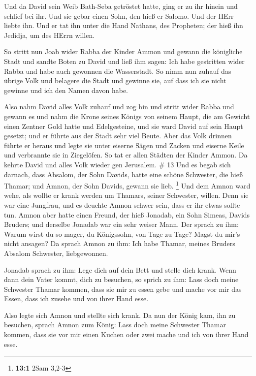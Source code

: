  Und da David sein Weib Bath-Seba getröstet hatte, ging er
zu ihr hinein und schlief bei ihr. Und sie gebar einen Sohn, den hieß er
Salomo. Und der HErr liebte ihn.  Und er tat ihn unter die
Hand Nathans, des Propheten; der hieß ihn Jedidja, um des HErrn willen.

 So stritt nun Joab wider Rabba der Kinder Ammon und gewann
die königliche Stadt  und sandte Boten zu David und ließ
ihm sagen: Ich habe gestritten wider Rabba und habe auch gewonnen die
Wasserstadt.  So nimm nun zuhauf das übrige Volk und
belagere die Stadt und gewinne sie, auf dass ich sie nicht gewinne und
ich den Namen davon habe.

 Also nahm David alles Volk zuhauf und zog hin und stritt
wider Rabba und gewann es  und nahm die Krone seines Königs
von seinem Haupt, die am Gewicht einen Zentner Gold hatte und
Edelgesteine, und sie ward David auf sein Haupt gesetzt; und er führte
aus der Stadt sehr viel Beute.  Aber das Volk drinnen
führte er heraus und legte sie unter eiserne Sägen und Zacken und
eiserne Keile und verbrannte sie in Ziegelöfen. So tat er allen Städten
der Kinder Ammon. Da kehrte David und alles Volk wieder gen Jerusalem.
\# 13  Und es begab sich darnach, dass Absalom, der Sohn
Davids, hatte eine schöne Schwester, die hieß Thamar; und Amnon, der
Sohn Davids, gewann sie lieb. \footnote{\textbf{13:1} 2Sam 3,2-3}
 Und dem Amnon ward wehe, als wollte er krank werden um
Thamars, seiner Schwester, willen. Denn sie war eine Jungfrau, und es
deuchte Amnon schwer sein, dass er ihr etwas sollte tun. 
Amnon aber hatte einen Freund, der hieß Jonadab, ein Sohn Simeas, Davids
Bruders; und derselbe Jonadab war ein sehr weiser Mann.  Der
sprach zu ihm: Warum wirst du so mager, du Königssohn, von Tage zu Tage?
Magst du mir's nicht ansagen? Da sprach Amnon zu ihm: Ich habe Thamar,
meines Bruders Absalom Schwester, liebgewonnen.

 Jonadab sprach zu ihm: Lege dich auf dein Bett und stelle
dich krank. Wenn dann dein Vater kommt, dich zu besuchen, so sprich zu
ihm: Lass doch meine Schwester Thamar kommen, dass sie mir zu essen gebe
und mache vor mir das Essen, dass ich zusehe und von ihrer Hand esse.

 Also legte sich Amnon und stellte sich krank. Da nun der
König kam, ihn zu besuchen, sprach Amnon zum König: Lass doch meine
Schwester Thamar kommen, dass sie vor mir einen Kuchen oder zwei mache
und ich von ihrer Hand esse.

